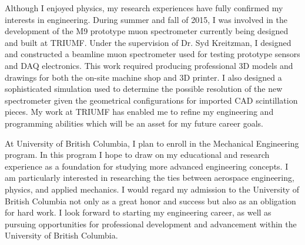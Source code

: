 \documentclass[11pt,a4paper]{moderncv} %
\begin{document}
 Although I enjoyed physics, my research experiences have fully confirmed my interests in engineering. During summer and fall of 2015, I was involved in the development of the M9 prototype muon spectrometer currently being designed and built at TRIUMF. Under the supervision of Dr. Syd Kreitzman, I designed and constructed a beamline muon spectrometer used for testing prototype sensors and DAQ electronics. This work required producing professional 3D models and drawings for both the on-site machine shop and 3D printer. I also designed a sophisticated simulation used to determine the possible resolution of the new spectrometer given the geometrical configurations for imported CAD scintillation pieces. My work at TRIUMF has enabled me to refine my engineering and programming abilities which will be an asset for my future career goals.  
 
 At University of British Columbia, I plan to enroll in the Mechanical Engineering program. In this program I hope to draw on my educational and research experience as a foundation for studying more advanced engineering concepts. I am particularly interested in researching the ties between aerospace engineering, physics, and applied mechanics. I would regard my admission to the University of British Columbia not only as a great honor and success but also as an obligation for hard work. I look forward to starting my engineering career, as well as pursuing opportunities for professional development and advancement within the University of British Columbia.
 
  


\end{document}
